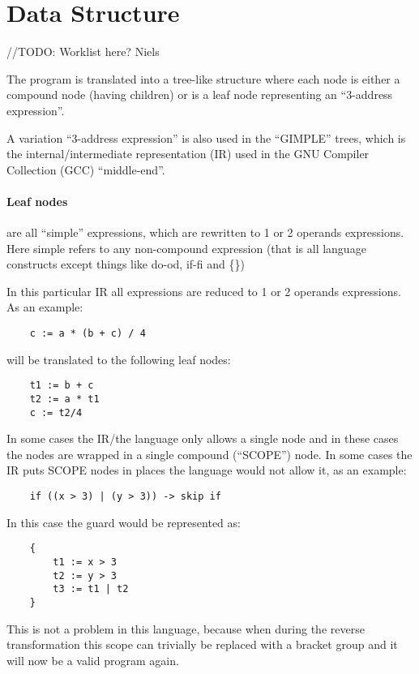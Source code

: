 \section{Data Structure}
//TODO: Worklist here? Niels

The program is translated into a tree-like structure where each node
is either a compound node (having children) or is a leaf node representing
an ``3-address expression''.

  A variation ``3-address expression'' is also used in the ``GIMPLE'' trees,
which is the internal/intermediate representation (IR) used in the GNU Compiler
Collection (GCC) ``middle-end''.

\paragraph*{Leaf nodes}
are all ``simple'' expressions, which are rewritten to 1 or 2 operands expressions. Here
simple refers to any non-compound expression (that is all language constructs
except things like do-od, if-fi and \{\})

In this particular IR all expressions are reduced to 1 or 2 operands expressions.
As an example:

\begin{lstlisting}
	c := a * (b + c) / 4
\end{lstlisting}
	
will be translated to the following leaf nodes:

\begin{lstlisting}
	t1 := b + c
	t2 := a * t1
	c := t2/4
\end{lstlisting}
	
In some cases the IR/the language only allows a single node and in these cases
the nodes are wrapped in a single compound (``SCOPE'') node. In some cases the
IR puts SCOPE nodes in places the language would not allow it, as an example:

\begin{lstlisting}
	if ((x > 3) | (y > 3)) -> skip if
\end{lstlisting}

In this case the guard would be represented as:

\begin{lstlisting}
	{
		t1 := x > 3
		t2 := y > 3
		t3 := t1 | t2
	}
\end{lstlisting}

This is not a problem in this language, because when during the reverse transformation
this scope can trivially be replaced with a bracket group and it will now be a valid
program again.

